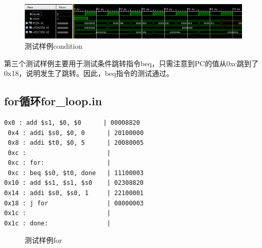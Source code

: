 \documentclass[twocolumn]{article} %
\begin{document}
\begin{sloppypar}
\begin{figure}[htbp]
\centering
\includegraphics[width =0.9 \linewidth]{figure/condition.png}
\caption{测试样例condition}
\end{figure}

第三个测试样例主要用于测试条件跳转指令beq，只需注意到PC的值从0xc跳到了0x18，说明发生了跳转。因此，beq指令的测试通过。

\subsection{for循环for\_loop.in}

\begin{lstlisting}[]   
 0x0 : add $s1, $0, $0      | 00008820
 0x4 : addi $s0, $0, 0      | 20100000
 0x8 : addi $t0, $0, 5      | 20080005
 0xc :                      | 
 0xc : for:                 | 
 0xc : beq $s0, $t0, done   | 11100003
0x10 : add $s1, $s1, $s0    | 02308820
0x14 : addi $s0, $s0, 1     | 22100001
0x18 : j for                | 08000003
0x1c :                      | 
0x1c : done:                | 
\end{lstlisting}  

\begin{figure}[htbp]
\centering
{}


\caption{测试样例for}
\end{figure}


\end{sloppypar}
\end{document}
